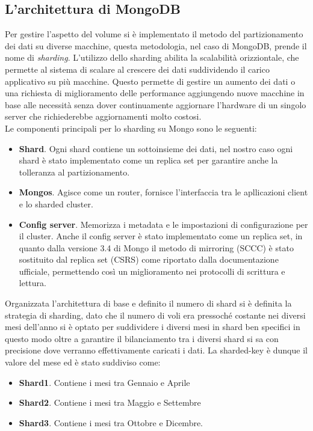 \documentclass[12pt]{article}
\begin{document}
\subsection{L'architettura di MongoDB}
Per gestire l'aspetto del volume si è implementato il metodo del partizionamento dei dati su diverse macchine, questa metodologia, nel caso di MongoDB, prende il nome di \textit{sharding}. L'utilizzo dello sharding abilita la scalabilità orizziontale, che permette al sistema di scalare al crescere dei dati suddividendo il carico applicativo su più macchine. Questo permette di gestire un aumento dei dati o una richiesta di miglioramento delle performance aggiungendo nuove macchine in base alle necessità senza dover continuamente aggiornare l'hardware di un singolo server che richiederebbe aggiornamenti molto costosi. \\
Le componenti principali per lo sharding su Mongo sono le seguenti:
\begin{itemize}
    \item \textbf{Shard}. Ogni shard contiene un sottoinsieme dei dati, nel nostro caso ogni shard è stato implementato come un replica set per garantire anche la tolleranza al partizionamento.
    \item \textbf{Mongos}. Agisce come un router, fornisce l'interfaccia tra le apllicazioni client e lo sharded cluster. 
    \item \textbf{Config server}. Memorizza i metadata e le impostazioni di configurazione per il cluster. Anche il config server è stato implementato come un replica set, in quanto dalla versione 3.4 di Mongo il metodo di mirroring (SCCC) è stato sostituito dal replica set (CSRS) come riportato dalla documentazione ufficiale, permettendo così un miglioramento nei protocolli di scrittura e lettura.
\end{itemize}
Organizzata l'architettura di base e definito il numero di shard si è definita la strategia di sharding, dato che il numero di voli era pressoché costante nei diversi mesi dell'anno si è optato per suddividere i diversi mesi in shard ben specifici in questo modo oltre a garantire il bilanciamento tra i diversi shard si sa con precisione dove verranno effettivamente caricati i dati. La sharded-key è dunque il valore del mese ed è stato suddiviso come:
\begin{itemize}
    \item \textbf{Shard1}. Contiene i mesi tra Gennaio e Aprile
    \item \textbf{Shard2}. Contiene i mesi tra Maggio e Settembre
    \item \textbf{Shard3}. Contiene i mesi tra Ottobre e Dicembre.
\end{itemize}
\end{document}
